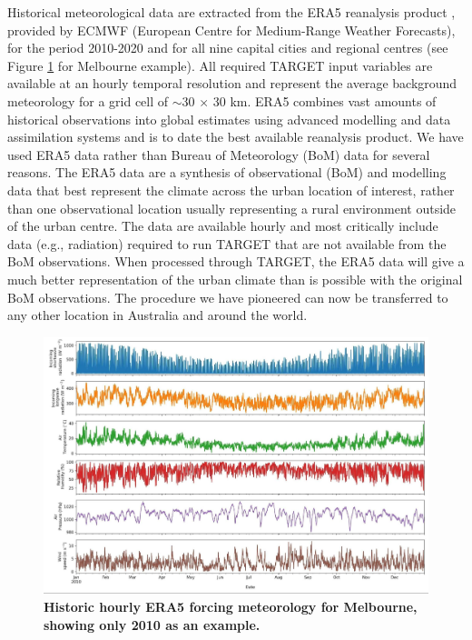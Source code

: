 \documentclass[utf8]{frontiersSCNS} %
\begin{document}



Historical meteorological data are extracted from the ERA5 reanalysis product \citep{Hersbach2020}, provided by ECMWF (European Centre for Medium-Range Weather Forecasts), for the period 2010-2020 and for all nine capital cities and regional centres (see Figure \ref{fig:mel_era5} for Melbourne example). All required TARGET input variables are available at an hourly temporal resolution and represent the average background meteorology for a grid cell of $\sim$30 $\times$ 30 km. ERA5 combines vast amounts of historical observations into global estimates using advanced modelling and data assimilation systems and is to date the best available reanalysis product. We have used ERA5 data rather than Bureau of Meteorology (BoM) data for several reasons. The ERA5 data are a synthesis of observational (BoM) and modelling data that best represent the climate across the urban location of interest, rather than one observational location usually representing a rural environment outside of the urban centre. The data are available hourly and most critically include data (e.g., radiation) required to run TARGET that are not available from the BoM observations. When processed through TARGET, the ERA5 data will give a much better representation of the urban climate than is possible with the original BoM observations. The procedure we have pioneered can now be transferred to any other location in Australia and around the world.

\begin{figure}
\centering
\includegraphics[trim={0 0 0 0},clip,scale=0.15]{images/image1.jpg}
\caption{\bf Historic hourly ERA5 forcing meteorology for Melbourne, showing only 2010 as an example.}
 \label{fig:mel_era5}
\end{figure}
\end{document}
